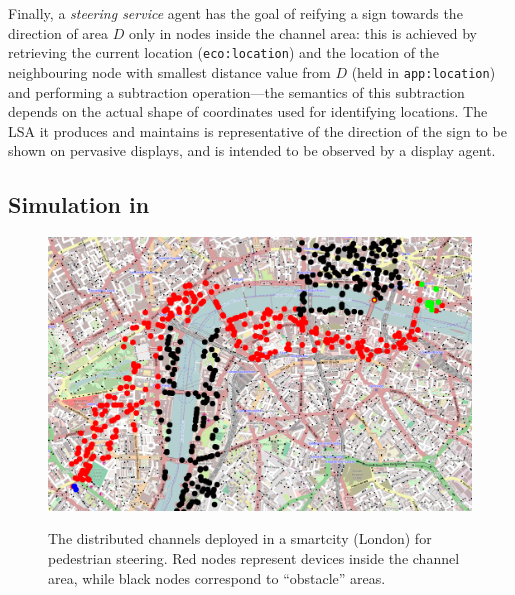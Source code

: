 \documentclass[12pt,a4paper,twoside,openright]{book}
\begin{document}
Finally, a \emph{steering service} agent has the goal of reifying a sign towards the direction of area $D$ only in nodes inside the channel area: this is achieved by retrieving the current location (\texttt{eco:location}) and the location  of the neighbouring node with smallest distance value from $D$ (held in \texttt{app:location}) and performing a subtraction operation---the semantics of this subtraction depends on the actual shape of coordinates used for identifying locations.
%
The LSA it produces and maintains is representative of the direction of the sign to be shown on pervasive displays, and is intended to be observed by a display agent.

\subsection{Simulation in \alchemist{}}

\begin{figure}
\begin{center}{\includegraphics[width=\textwidth]{img/london-channel}}\end{center}
\caption[Channel deployed in London]{The distributed channels deployed in a smartcity (London) for pedestrian steering. Red nodes represent devices inside the channel area, while black nodes correspond to ``obstacle'' areas.}
\label{f:london}
\end{figure}
\end{document}
